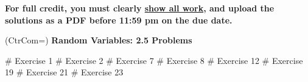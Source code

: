 \documentclass[11pt]{book}
\begin{document}
\thispagestyle{fancy}
\noindent	\textbf{For full credit, you must clearly \underline{show all work}, and upload the solutions as a PDF before 11:59 pm on the due date.}\hfill
\vspace{0.3in}

\begin{easylist}
\ListProperties(CtrCom=\fbox)
\textbf{Random Variables: 2.5 Problems}\\
\vspace{0.5in}

# Exercise 1
\vspace{0.2in} 
# Exercise 2
\vspace{0.2in}
# Exercise 7
\vspace{0.2in}
# Exercise 8
\vspace{0.2in}
# Exercise 12
\vspace{0.2in}
# Exercise 19
\vspace{0.2in}
# Exercise 21
\vspace{0.2in}
# Exercise 23
 \end{easylist}
\end{document}
